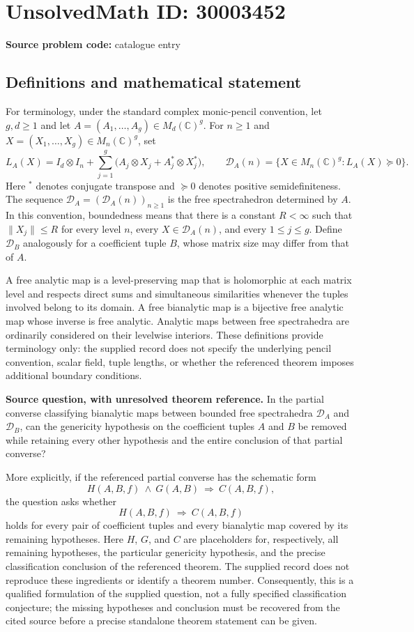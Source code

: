 \documentclass[11pt]{article}
\newcommand{\C}{\mathbb{C}}
\begin{document}
\section*{UnsolvedMath ID: 30003452}
\textbf{Source problem code:} catalogue entry
\subsection{Definitions and mathematical statement}
For terminology, under the standard complex monic-pencil convention, let \(g,d\geq 1\) and let \(A=(A_1,\ldots,A_g)\in M_d(\C)^g\). For \(n\geq 1\) and \(X=(X_1,\ldots,X_g)\in M_n(\C)^g\), set
\[
L_A(X)=I_d\otimes I_n+\sum_{j=1}^g\bigl(A_j\otimes X_j+A_j^*\otimes X_j^*\bigr),
\qquad
\mathcal D_A(n)=\{X\in M_n(\C)^g:L_A(X)\succeq 0\}.
\]
Here \(^*\) denotes conjugate transpose and \(\succeq 0\) denotes positive semidefiniteness. The sequence \(\mathcal D_A=(\mathcal D_A(n))_{n\geq 1}\) is the free spectrahedron determined by \(A\). In this convention, boundedness means that there is a constant \(R<\infty\) such that \(\|X_j\|\leq R\) for every level \(n\), every \(X\in\mathcal D_A(n)\), and every \(1\leq j\leq g\). Define \(\mathcal D_B\) analogously for a coefficient tuple \(B\), whose matrix size may differ from that of \(A\).

A free analytic map is a level-preserving map that is holomorphic at each matrix level and respects direct sums and simultaneous similarities whenever the tuples involved belong to its domain. A free bianalytic map is a bijective free analytic map whose inverse is free analytic. Analytic maps between free spectrahedra are ordinarily considered on their levelwise interiors. These definitions provide terminology only: the supplied record does not specify the underlying pencil convention, scalar field, tuple lengths, or whether the referenced theorem imposes additional boundary conditions.

\textbf{Source question, with unresolved theorem reference.} In the partial converse classifying bianalytic maps between bounded free spectrahedra \(\mathcal D_A\) and \(\mathcal D_B\), can the genericity hypothesis on the coefficient tuples \(A\) and \(B\) be removed while retaining every other hypothesis and the entire conclusion of that partial converse?

More explicitly, if the referenced partial converse has the schematic form
\[
H(A,B,f)\ \land\ G(A,B)\ \Longrightarrow\ C(A,B,f),
\]
the question asks whether
\[
H(A,B,f)\ \Longrightarrow\ C(A,B,f)
\]
holds for every pair of coefficient tuples and every bianalytic map covered by its remaining hypotheses. Here \(H\), \(G\), and \(C\) are placeholders for, respectively, all remaining hypotheses, the particular genericity hypothesis, and the precise classification conclusion of the referenced theorem. The supplied record does not reproduce these ingredients or identify a theorem number. Consequently, this is a qualified formulation of the supplied question, not a fully specified classification conjecture; the missing hypotheses and conclusion must be recovered from the cited source before a precise standalone theorem statement can be given.
\end{document}
